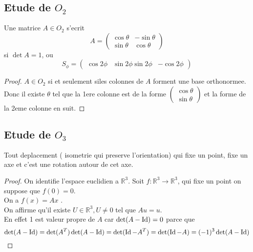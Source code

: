 \documentclass[../main.tex]{subfiles}
\begin{document}
\subsection{Etude de $O_2$ }
\begin{propo}
Une matrice $A \in O_2$ s'ecrit 
\[ 
A =
\begin{pmatrix}
	\cos \theta & - \sin \theta\\
	\sin \theta & \cos \theta
\end{pmatrix} 
\]
si $\det A = 1$, ou
\[ 
S_{\phi} = 
\begin{pmatrix}
	\cos 2 \phi & \sin 2 \phi
	\sin 2\phi & - \cos 2 \phi
\end{pmatrix} 
\]


\end{propo}
\begin{proof}
	$A \in O_2$ si et seulement siles colonnes de $A $ forment une base orthonormee. Donc il existe $\theta$ tel que la 1ere colonne est de la forme $\begin{pmatrix}
	\cos\theta\\\sin\theta
	\end{pmatrix} $ et la forme de la 2eme colonne en suit.
\end{proof}
\subsection{Etude de $O_3$ }
\begin{thm}
	Tout deplacement ( isometrie qui preserve l'orientation) qui fixe un point, fixe un axe et c'est une rotation autour de cet axe.
\end{thm}
\begin{proof}
	On identifie l'espace euclidien a $\mathbb{R}^{3}$. Soit $f: \mathbb{R}^{3}\to \mathbb{R}^{3}$, qui fixe un point on suppose que $f( 0) =0$.\\
	On a $f( x) =Ax$ .\\
	On affirme qu'il existe $U \in \mathbb{R}^{3}, U \neq 0$ tel que $Au =u$.\\
	En effet 1 est valeur propre de $A$ car $\det ( A-\operatorname{Id}) =0$ parce que
	\[ 
		\det ( A-\operatorname{Id}) = \det( A^{T}) \det( A-\operatorname{Id}) = \det ( \operatorname{Id} - A^{T})  = \det ( \operatorname{Id} - A) = ( -1) ^{3}\det ( A-\operatorname{Id}) 
	\]
	
\end{proof}

					

				




		
	
\end{document}
